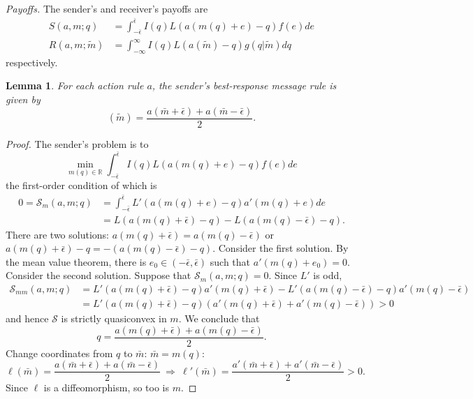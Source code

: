\documentclass[12pt]{article}
\newtheorem{lemma}{Lemma}
\begin{document}
\noindent\textit{Payoffs.} The sender's and receiver's payoffs are 
\begin{align}
S(a,m;q)&=\int_{-\bar{\epsilon}}^{\bar{\epsilon}}{I(q)L(a(m(q)+e)-q)f(e)de}\\
R(a,m;\tilde{m})&=\int_{-\infty}^{\infty}{I(q)L(a(\tilde{m})-q)g(q|\tilde{m})dq}
\end{align}
respectively.

\begin{lemma}\label{lemma:message}
For each action rule $a$, the sender's best-response message rule is given by
\begin{equation}
[\mathcal{S}(a)](\tilde{m})=\frac{a(\bar{m}+\bar{\epsilon})+a(\bar{m}-\bar{\epsilon})}{2}.
\end{equation}
\end{lemma}
\begin{proof}
The sender's problem is to
\begin{equation}
\min_{m(q)\in\mathbb{R}}\int_{-\bar{\epsilon}}^{\bar{\epsilon}}{I(q)L(a(m(q)+e)-q)f(e)de}
\end{equation}
the first-order condition of which is
\begin{align}
0=\mathcal{S}_{m}(a,m;q)&=\int_{-\bar{\epsilon}}^{\bar{\epsilon}}{L'(a(m(q)+e)-q)a'(m(q)+e)de}\\
&=L(a(m(q)+\bar{\epsilon})-q)-L(a(m(q)-\bar{\epsilon})-q).
\end{align}
There are two solutions: $a(m(q)+\bar{\epsilon})=a(m(q)-\bar{\epsilon})$ or $a(m(q)+\bar{\epsilon})-q=-(a(m(q)-\bar{\epsilon})-q)$. Consider the first solution. By the mean value theorem, there is $e_{0}\in(-\bar{\epsilon},\bar{\epsilon})$ such that $a'(m(q)+e_{0})=0$. Consider the second solution. Suppose that $\mathcal{S}_{m}(a,m;q)=0$. Since $L'$ is odd, 
\begin{align}
\mathcal{S}_{mm}(a,m;q)&=L'(a(m(q)+\bar{\epsilon})-q)a'(m(q)+\bar{\epsilon})-L'(a(m(q)-\bar{\epsilon})-q)a'(m(q)-\bar{\epsilon})\\
&=L'(a(m(q)+\bar{\epsilon})-q)(a'(m(q)+\bar{\epsilon})+a'(m(q)-\bar{\epsilon}))>0
\end{align}
and hence $\mathcal{S}$ is strictly quasiconvex in $m$. We conclude that 
\begin{equation}
q=\frac{a(m(q)+\bar{\epsilon})+a(m(q)-\bar{\epsilon})}{2}.
\end{equation}
Change coordinates from $q$ to $\bar{m}$: $\bar{m}=m(q)$:
\begin{equation}
\ell(\bar{m})=\frac{a(\bar{m}+\bar{\epsilon})+a(\bar{m}-\bar{\epsilon})}{2}\:\Rightarrow\:\ell'(\bar{m})=\frac{a'(\bar{m}+\bar{\epsilon})+a'(\bar{m}-\bar{\epsilon})}{2}>0.
\end{equation}
Since $\ell$ is a diffeomorphism, so too is $m$. 
\end{proof}
\end{document}
